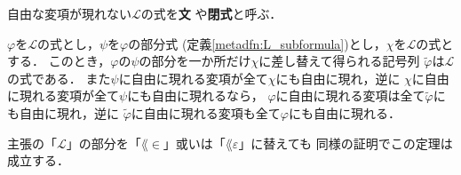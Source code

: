 	\begin{screen}
		\begin{metadfn}[文]
			自由な変項が現れない$\mathcal{L}$の式を{\bf 文}
			や{\bf 閉式}と呼ぶ．
		\end{metadfn}
	\end{screen}
	
	\begin{screen}
		\begin{metathm}[部分式を取り替えても式]
		\label{metathm:replace_subformula_with_some_formula}
			$\varphi$を$\mathcal{L}$の式とし，$\psi$を$\varphi$の部分式
			(定義\ref{metadfn:L_subformula})とし，$\chi$を$\mathcal{L}$の式とする．
			このとき，$\varphi$の$\psi$の部分を一か所だけ$\chi$に差し替えて得られる記号列
			$\widetilde{\varphi}$は$\mathcal{L}$の式である．
			また$\psi$に自由に現れる変項が全て$\chi$にも自由に現れ，逆に
			$\chi$に自由に現れる変項が全て$\psi$にも自由に現れるなら，
			$\varphi$に自由に現れる変項は全て$\widetilde{\varphi}$にも自由に現れ，逆に
			$\widetilde{\varphi}$に自由に現れる変項も全て$\varphi$にも自由に現れる．
		\end{metathm}
	\end{screen}
	
	主張の「$\mathcal{L}$」の部分を「$\lang{\in}$」或いは「$\lang{\varepsilon}$」に替えても
	同様の証明でこの定理は成立する．
	
